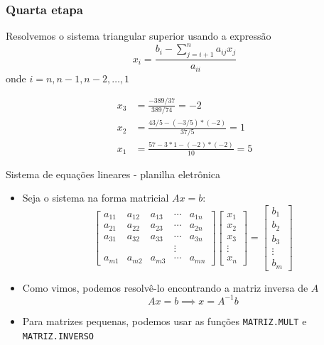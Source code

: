 \begin{frame}
    \frametitle{Quarta etapa}
    Resolvemos o sistema triangular superior usando a expressão
    \[
        x_i = \frac{b_i - \sum_{j=i+1}^{n} {a_{ij} x_j}}{a_{ii}}
    \]
    onde \(i = n, n-1, n-2, \ldots , 1\)

    \begin{align*}
        x_3 &= \frac{-389/37}{389/74}=-2 \\
        x_2 & =\frac{43/5 - (-3/5)*(-2)}{37/5}=1 \\
        x_1 &= \frac{57-3*1-(-2)*(-2)}{10} = 5
    \end{align*}

\end{frame}


\begin{frame}{Sistema de equações lineares - planilha eletrônica}
    \begin{itemize}
        \item Seja o sistema na forma matricial \(Ax=b\):
            \[
                \begin{bmatrix}
                    a_{11} & a_{12} & a_{13} & \cdots & a_{1n}  \\
                    a_{21} & a_{22} & a_{23} & \cdots & a_{2n}  \\
                    a_{31} & a_{32} & a_{33} & \cdots & a_{3n}  \\
                           &        &        & \vdots &         \\
                    a_{m1} & a_{m2} & a_{m3} & \cdots & a_{mn}
                \end{bmatrix}
                \begin{bmatrix}
                    x_1 \\ x_2 \\ x_3 \\ \vdots \\ x_n
                \end{bmatrix}=
                \begin{bmatrix}
                    b_1 \\ b_2 \\ b_3 \\ \vdots \\ b_m
                \end{bmatrix}
            \]
        \item Como vimos, podemos resolvê-lo encontrando a matriz inversa de \(A\)
            \[
                Ax=b \implies x=A^{-1}b
            \]
        \item Para matrizes pequenas, podemos usar as funções \texttt{MATRIZ.MULT} e \texttt{MATRIZ.INVERSO}
    \end{itemize}
\end{frame}

